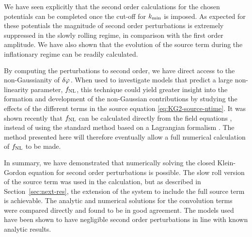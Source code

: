 We have seen explicitly that the second order calculations for the chosen
potentials can be completed once the cut-off for $k_{\mathrm{min}}$ is
imposed. As expected for these potentials the magnitude of second order perturbations
is extremely
suppressed in the slowly rolling regime, in comparison with the first order
amplitude.
We have also shown that the
evolution of the source term during the inflationary regime can be
readily calculated.


By computing the perturbations to second order, we have direct access
to the non-Gaussianity of $\delta\varphi_{}$. When used to investigate models
that predict a large non-linearity parameter, $f_{\mathrm{NL}}$, this technique
could yield greater insight into the formation and development of the
non-Gaussian contributions by studying the effects of the different
terms in the source equation \eqref{eq:KG2-source-ntime}.
%
It was shown recently that $f_{\mathrm{NL}}$ can be calculated directly from the field
equations \cite{Musso:2006pt,Seery:2008qj}, instead of
using the standard method based on a Lagrangian formalism
\cite{Maldacena:2002vr}. The method presented here
will
therefore eventually allow a full numerical calculation of $f_{\mathrm{NL}}$ to be made.


In summary, we have demonstrated that numerically solving the closed
Klein-Gordon equation for second order perturbations is possible. The slow roll
version of the source term was used in the calculation, but
as described in Section~\ref{sec:next-res}, the extension of the system to include
the full source term is achievable. 
The analytic and numerical solutions for the convolution terms were
compared directly and found to be in good agreement.
The models used have been shown to have negligible second order
perturbations in line with known analytic results. 
